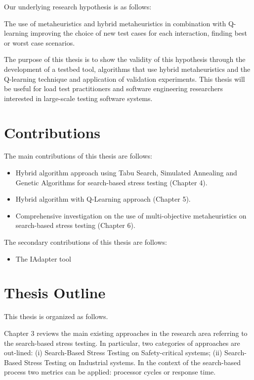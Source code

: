 \documentclass{report}
\begin{document}
Our underlying research hypothesis is as follows:

\begin{mdframed}[roundcorner=10pt]
The use of metaheuristics and hybrid metaheuristics in combination with Q-learning improving the choice of new test cases for each interaction, finding best or worst case scenarios.
\end{mdframed}

The purpose of this thesis is to show the validity of this hypothesis through the development of a testbed tool, algorithms that use hybrid metaheuristics and the Q-learning technique and application of validation experiments. This thesis will be useful for load test practitioners and software engineering researchers interested in large-scale testing software systems.

\section{Contributions}

The main contributions of this thesis are follows:

\begin{itemize}
\item Hybrid algorithm approach using Tabu Search, Simulated Annealing and Genetic Algorithms for search-based stress testing (Chapter 4).
\item Hybrid algorithm with Q-Learning approach (Chapter 5).
\item Comprehensive investigation on the use of multi-objective metaheuristics on search-based stress testing (Chapter 6).
\end{itemize}


The secondary contributions of this thesis are follows:

\begin{itemize}
\item The IAdapter tool
\end{itemize}



\section{Thesis Outline}

This thesis is organized as follows.

Chapter 3 reviews the main existing approaches in the research area referring to the search-based stress testing. In particular, two categories of approaches are out-lined: (i) Search-Based Stress Testing on Safety-critical systems; (ii) Search-Based Stress Testing on Industrial systems. In the context of the search-based process two metrics can be applied: processor cycles or response time.
\end{document}
